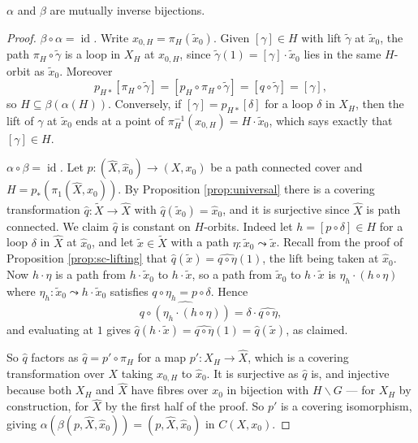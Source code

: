\documentclass[a4paper]{scrartcl}
\newcommand{\id}{\operatorname{id}}
\begin{document}
\begin{theorem} \label{thm:galois}
	$\alpha$ and $\beta$ are mutually inverse bijections.
\end{theorem}
\begin{proof}
	\emph{$\beta \circ \alpha = \id$.} Write $x_{0,H} = \pi_H(\tilde x_0)$. Given $[\gamma] \in H$ with lift $\tilde\gamma$ at $\tilde x_0$, the path $\pi_H \circ \tilde\gamma$ is a loop in $X_H$ at $x_{0,H}$, since $\tilde\gamma(1) = [\gamma]\cdot\tilde x_0$ lies in the same $H$-orbit as $\tilde x_0$. Moreover
	$$
	p_{H*}[\pi_H \circ \tilde\gamma] = [p_H \circ \pi_H \circ \tilde\gamma] = [q \circ \tilde\gamma] = [\gamma],
	$$
	so $H \subseteq \beta(\alpha(H))$. Conversely, if $[\gamma] = p_{H*}[\delta]$ for a loop $\delta$ in $X_H$, then the lift of $\gamma$ at $\tilde x_0$ ends at a point of $\pi_H^{-1}(x_{0,H}) = H\cdot\tilde x_0$, which says exactly that $[\gamma] \in H$.

	\emph{$\alpha \circ \beta = \id$.} Let $p: (\hat X, \hat x_0) \to (X, x_0)$ be a path connected cover and $H = p_*(\pi_1(\hat X, \hat x_0))$. By Proposition \ref{prop:universal} there is a covering transformation $\hat q: \widetilde X \to \hat X$ with $\hat q(\tilde x_0) = \hat x_0$, and it is surjective since $\hat X$ is path connected. We claim $\hat q$ is constant on $H$-orbits. Indeed let $h = [p\circ\delta] \in H$ for a loop $\delta$ in $\hat X$ at $\hat x_0$, and let $\tilde x \in \widetilde X$ with a path $\eta: \tilde x_0 \leadsto \tilde x$. Recall from the proof of Proposition \ref{prop:sc-lifting} that $\hat q(\tilde x) = \widehat{q\circ\eta}(1)$, the lift being taken at $\hat x_0$. Now $h \cdot \eta$ is a path from $h\cdot\tilde x_0$ to $h \cdot \tilde x$, so a path from $\tilde x_0$ to $h\cdot\tilde x$ is $\eta_h \cdot (h\circ\eta)$ where $\eta_h: \tilde x_0 \leadsto h \cdot \tilde x_0$ satisfies $q \circ \eta_h = p \circ \delta$. Hence
	$$
	\widehat{q \circ (\eta_h \cdot (h\circ \eta))} = \delta \cdot \widehat{q \circ \eta},
	$$
	and evaluating at $1$ gives $\hat q(h\cdot\tilde x) = \widehat{q\circ\eta}(1) = \hat q(\tilde x)$, as claimed.

	So $\hat q$ factors as $\hat q = p' \circ \pi_H$ for a map $p': X_H \to \hat X$, which is a covering transformation over $X$ taking $x_{0,H}$ to $\hat x_0$. It is surjective as $\hat q$ is, and injective because both $X_H$ and $\hat X$ have fibres over $x_0$ in bijection with $H\backslash G$ --- for $X_H$ by construction, for $\hat X$ by the first half of the proof. So $p'$ is a covering isomorphism, giving $\alpha(\beta(p,\hat X, \hat x_0)) = (p, \hat X, \hat x_0)$ in $C(X, x_0)$.
\end{proof}
\end{document}
